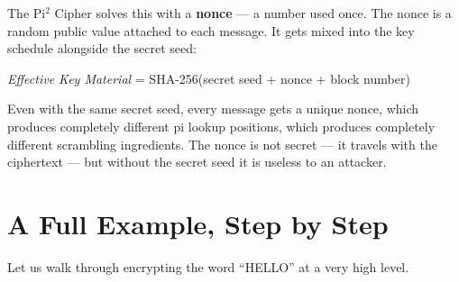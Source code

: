 \documentclass[12pt, a4paper]{article}
\begin{document}
The Pi$^2$ Cipher solves this with a \textbf{nonce} --- a number used once. The nonce is a random public value attached to each message. It gets mixed into the key schedule alongside the secret seed:

\vspace{0.3em}
\begin{center}
\textit{Effective Key Material} = SHA-256(secret seed + nonce + block number)
\end{center}
\vspace{0.3em}

Even with the same secret seed, every message gets a unique nonce, which produces completely different pi lookup positions, which produces completely different scrambling ingredients. The nonce is not secret --- it travels with the ciphertext --- but without the secret seed it is useless to an attacker.

\section{A Full Example, Step by Step}

\vspace{0.5em}

Let us walk through encrypting the word ``HELLO'' at a very high level.
\end{document}
